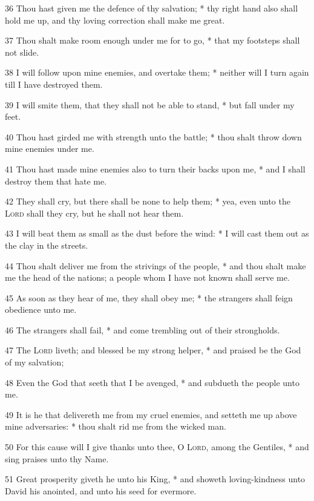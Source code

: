 36 Thou hast given me the defence of thy salvation; * thy right hand also shall hold me up, and thy loving correction shall make me great.\par
37 Thou shalt make room enough under me for to go, * that my footsteps shall not slide.\par
38 I will follow upon mine enemies, and overtake them; * neither will I turn again till I have destroyed them.\par
39 I will smite them, that they shall not be able to stand, * but fall under my feet.\par
40 Thou hast girded me with strength unto the battle; * thou shalt throw down mine enemies under me.\par
41 Thou hast made mine enemies also to turn their backs upon me, * and I shall destroy them that hate me.\par
42 They shall cry, but there shall be none to help them; * yea, even unto the {\textsc{Lord}} shall they cry, but he shall not hear them.\par
43 I will beat them as small as the dust before the wind: * I will cast them out as the clay in the streets.\par
44 Thou shalt deliver me from the strivings of the people, * and thou shalt make me the head of the nations; a people whom I have not known shall serve me.\par
45 As soon as they hear of me, they shall obey me; * the strangers shall feign obedience unto me.\par
46 The strangers shall fail, * and come trembling out of their strongholds.\par
47 The {\textsc{Lord}} liveth; and blessed be my strong helper, * and praised be the God of my salvation;\par
48 Even the God that seeth that I be avenged, * and subdueth the people unto me.\par
49 It is he that delivereth me from my cruel enemies, and setteth me up above mine adversaries: * thou shalt rid me from the wicked man.\par
50 For this cause will I give thanks unto thee, O {\textsc{Lord}}, among the Gentiles, * and sing praises unto thy Name.\par
51 Great prosperity giveth he unto his King, * and showeth loving-kindness unto David his anointed, and unto his seed for evermore.
